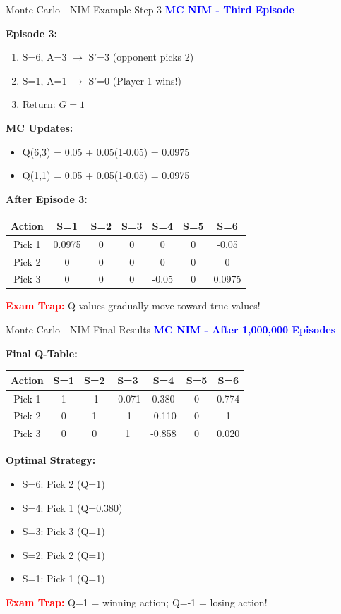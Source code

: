 \documentclass[8pt]{beamer}
\begin{document}
	\begin{frame}{Monte Carlo - NIM Example Step 3}
		\fontsize{6.5}{7.5}\selectfont
		\textcolor{blue}{\textbf{MC NIM - Third Episode}}
		
		\textbf{Episode 3:}
		\begin{enumerate}
			\item S=6, A=3 $\rightarrow$ S'=3 (opponent picks 2)
			\item S=1, A=1 $\rightarrow$ S'=0 (Player 1 wins!)
			\item Return: $G = 1$
		\end{enumerate}
		
		\textbf{MC Updates:}
		\begin{itemize}
			\item Q(6,3) = 0.05 + 0.05(1-0.05) = 0.0975
			\item Q(1,1) = 0.05 + 0.05(1-0.05) = 0.0975
		\end{itemize}
		
		\textbf{After Episode 3:}
		\begin{tabular}{|c|c|c|c|c|c|c|}
			\hline
			Action & S=1 & S=2 & S=3 & S=4 & S=5 & S=6 \\
			\hline
			Pick 1 & 0.0975 & 0 & 0 & 0 & 0 & -0.05 \\
			\hline
			Pick 2 & 0 & 0 & 0 & 0 & 0 & 0 \\
			\hline
			Pick 3 & 0 & 0 & 0 & -0.05 & 0 & 0.0975 \\
			\hline
		\end{tabular}
		
		\textcolor{red}{\textbf{Exam Trap:}} Q-values gradually move toward true values!
	\end{frame}
	
	\begin{frame}{Monte Carlo - NIM Final Results}
		\fontsize{6.5}{7.5}\selectfont
		\textcolor{blue}{\textbf{MC NIM - After 1,000,000 Episodes}}
		
		\textbf{Final Q-Table:}
		\begin{tabular}{|c|c|c|c|c|c|c|}
			\hline
			Action & S=1 & S=2 & S=3 & S=4 & S=5 & S=6 \\
			\hline
			Pick 1 & 1 & -1 & -0.071 & 0.380 & 0 & 0.774 \\
			\hline
			Pick 2 & 0 & 1 & -1 & -0.110 & 0 & 1 \\
			\hline
			Pick 3 & 0 & 0 & 1 & -0.858 & 0 & 0.020 \\
			\hline
		\end{tabular}
		
		\textbf{Optimal Strategy:}
		\begin{itemize}
			\item S=6: Pick 2 (Q=1)
			\item S=4: Pick 1 (Q=0.380)
			\item S=3: Pick 3 (Q=1)
			\item S=2: Pick 2 (Q=1)
			\item S=1: Pick 1 (Q=1)
		\end{itemize}
		
		\textcolor{red}{\textbf{Exam Trap:}} Q=1 = winning action; Q=-1 = losing action!
	\end{frame}
	
\end{document}
